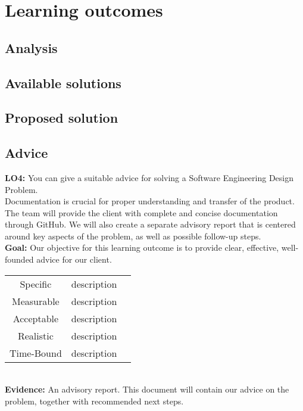 \section{Learning outcomes}
\label{sec:Learngin-Outcomes}

\subsection{Analysis}
\label{subsec:Analysis}

\subsection{Available solutions}
\label{subsec:Available solutions}

\subsection{Proposed solution}
\label{subsec:Proposed solution}

\subsection{Advice}
\label{subsec:Advice}

\textbf{LO4:} You can give a suitable advice for solving a Software Engineering Design Problem. \\

Documentation is crucial for proper understanding and transfer of the product. The team will provide the client with complete and concise documentation through GitHub. We will also create a separate advisory report that is centered around key aspects of the problem, as well as possible follow-up steps. \\

\textbf{Goal:} Our objective for this learning outcome is to provide clear, effective, well-founded advice for our client.\\

\begin{tabular}{ |c|c|c| } 
	\hline
	Specific & description  \\ 
	Measurable & description  \\ 
	Acceptable & description  \\
	Realistic & description \\
	Time-Bound & description \\ 
	\hline
\end{tabular} \\

\textbf{Evidence:}
An advisory report. This document will contain our advice on the problem, together with recommended next steps. 

